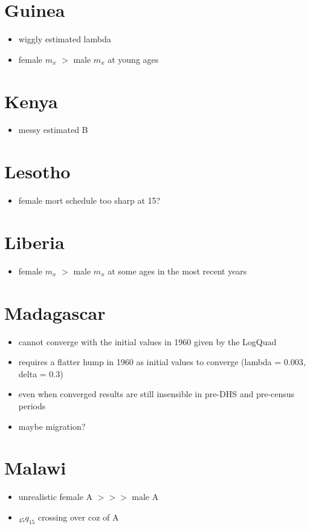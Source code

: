 \documentclass[12pt,a4paper]{article}
\begin{document}
\section*{Guinea}
\begin{itemize}
\item wiggly estimated lambda
\item female $m_x$ $>$ male $m_x$ at young ages 
\end{itemize}

\section*{Kenya}
\begin{itemize}
\item messy estimated B
\end{itemize}

\section*{Lesotho}
\begin{itemize}
\item female mort schedule too sharp at 15?
\end{itemize}

\section*{Liberia}
\begin{itemize}
\item  female $m_x$ $>$ male $m_x$ at some ages in the most recent years
\end{itemize}

\section*{Madagascar}
\begin{itemize}
\item cannot converge with the initial values in 1960 given by the LogQuad
\item requires a flatter hump in 1960 as initial values to converge (lambda = 0.003, delta = 0.3)
\item even when converged results are still insensible in pre-DHS and pre-census periods
\item maybe migration?
\end{itemize}

\section*{Malawi}
\begin{itemize}
\item unrealistic female A $>>>$ male A
\item $_{45}q_{15}$ crossing over coz of A
\end{itemize}
\end{document}
